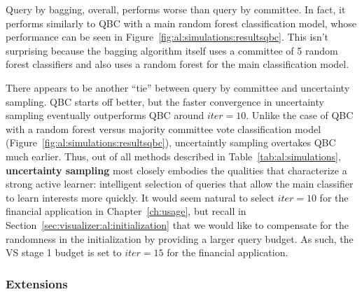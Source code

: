 Query by bagging, overall, performs worse than query by committee. In fact, it 
performs similarly to QBC with a main random forest classification model, whose 
performance can be seen in Figure~\ref{fig:al:simulations:resultsqbc}. 
This isn't surprising because the bagging algorithm itself uses a committee of 
5 random forest classifiers and also uses a random forest for the main 
classification model. 

There appears to be another ``tie'' between query by committee and uncertainty 
sampling. QBC starts off better, but the faster convergence in uncertainty 
sampling eventually outperforms QBC around $iter = 10$. Unlike the case of QBC 
with a random forest versus majority committee vote classification model 
(Figure~\ref{fig:al:simulations:resultsqbc}), uncertaintly sampling overtakes 
QBC much earlier. Thus, out of all methods described in 
Table~\ref{tab:al:simulations}, \textbf{uncertainty sampling} most closely 
embodies the qualities that characterize a strong active learner: intelligent 
selection of queries that allow the main classifier to learn interests more 
quickly. It would seem natural to select $iter = 10$ for the financial 
application in Chapter~\ref{ch:usage}, but recall in 
Section~\ref{sec:visualizer:al:initialization} that we would like to compensate 
for the randomness in the initialization by providing a larger query budget. As 
such, the VS stage 1 budget is set to $iter = 15$ for the financial application.

%

\subsubsection{Extensions}

